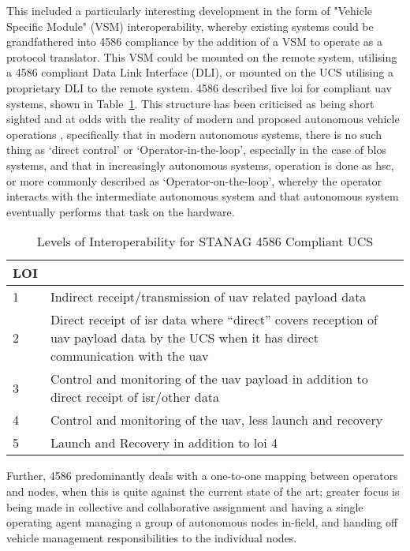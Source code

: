 This included a particularly interesting development in the form of "Vehicle Specific Module" (VSM) interoperability, whereby existing systems could be grandfathered into 4586 compliance by the addition of a VSM to operate as a protocol translator.
This VSM could be mounted on the remote system, utilising a 4586 compliant Data Link Interface (DLI), or mounted on the UCS utilising a proprietary DLI to the remote system.
4586 described five \gls{loi} for compliant \gls{uav} systems, shown in Table~\ref{tab:levels_of_interoperability}.
This structure has been criticised as being short sighted and at odds with the reality of modern and proposed autonomous vehicle operations \cite{Cummings2010}, specifically that in modern autonomous systems, there is no such thing as ‘direct control’ or ‘Operator-in-the-loop’, especially in the case of \gls{blos} systems, and that in increasingly autonomous systems, operation is done as \gls{hsc}, or more commonly described as ‘Operator-on-the-loop’, whereby the operator interacts with the intermediate autonomous system and that autonomous system eventually performs that task on the hardware.

\begin{table}
  \begin{tabularx}{\textwidth}{|l|X|}
    \hline  LOI &  \\ 
    \hline  1 &  Indirect receipt/transmission of \gls{uav} related payload data\\ 
    \hline  2 &  Direct receipt of \gls{isr} data where “direct” covers reception of \gls{uav} payload data by the UCS when it has direct communication with the \gls{uav}\\ 
    \hline  3 &  Control and monitoring of the \gls{uav} payload in addition to direct receipt of \gls{isr}/other data\\ 
    \hline  4 &  Control and monitoring of the \gls{uav}, less launch and recovery\\
    \hline  5 &  Launch and Recovery in addition to \gls{loi} 4\\ 
    \hline 
  \end{tabularx}
  \caption{Levels of Interoperability for STANAG 4586 Compliant UCS}
  \label{tab:levels_of_interoperability}
\end{table}


Further, 4586 predominantly deals with a one-to-one mapping between operators and nodes, when this is quite against the current state of the art; greater focus is being made in collective and collaborative assignment and having a single operating agent managing a group of autonomous nodes in-field, and handing off vehicle management responsibilities to the individual nodes.

